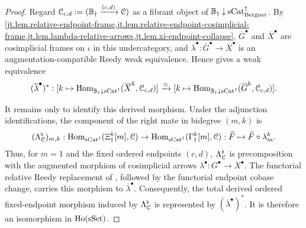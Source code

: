 \documentclass[a4paper,dvipdfmx,11pt]{amsart}
\begin{document}
\begin{proof}
  Regard $\mathcal{C}_{c,d}:=(\mathbb{B}_{\dag}\xrightarrow{(c,d)}\mathcal{C})$ as a fibrant object of $\mathbb{B}_{\dag}\mathbin{\downarrow}\mathrm{sCat}^{\dag}_{\mathrm{Bergner}}$.
  By \cref{jt.lem.relative-endpoint-frame,jt.lem.relative-endpoint-cosimplicial-frame,jt.lem.lambda-relative-arrows,jt.lem.xi-endpoint-collapse},
  $\overline G^{\bullet}$ and $\overline X^{\bullet}$ are cosimplicial frames on $\iota$ in this undercategory, and $\overline\lambda^{\bullet}:\overline G^{\bullet}\to\overline X^{\bullet}$ is an augmentation-compatible Reedy weak equivalence.
  Hence \cite[Corollary~16.5.5 (1)]{Hir02} gives a weak equivalence
  \begin{align}
    (\overline\lambda^{\bullet})^{*}:
    [k\mapsto
      \operatorname{Hom}_{\mathbb{B}_{\dag}\mathbin{\downarrow}\mathrm{sCat}^{\dag}}
      (\overline X^k,\mathcal{C}_{c,d})]
    \xrightarrow{\simeq}
    [k\mapsto
      \operatorname{Hom}_{\mathbb{B}_{\dag}\mathbin{\downarrow}\mathrm{sCat}^{\dag}}
      (\overline G^k,\mathcal{C}_{c,d})].
  \end{align}

  It remains only to identify this derived morphism.
  Under the adjunction identifications, the component of the right mate in bidegree $(m,k)$ is
  \begin{align}
    (\Lambda^{\flat}_{\mathcal{C}})_{m,k}:
    \operatorname{Hom}_{\mathrm{sCat}^{\dag}}(\Xi^k_{\dag}[m],\mathcal{C})
    \to
    \operatorname{Hom}_{\mathrm{sCat}^{\dag}}(\Gamma^k_{\dag}[m],\mathcal{C}) : 
    \widehat F
    \mapsto
    \widehat F\circ\lambda_m^k.
  \end{align}
  Thus, for $m=1$ and the fixed ordered endpoints $(c,d)$, $\Lambda^{\flat}_{\mathcal{C}}$ is precomposition with the augmented morphism of cosimplicial arrows $\lambda^{\bullet}:G^{\bullet}\to X^{\bullet}$.
  The functorial relative Reedy replacement of \cite[Proposition~16.6.8 (1)]{Hir02}, followed by the functorial endpoint cobase change, carries this morphism to $\overline\lambda^{\bullet}$.
  Consequently, the total derived ordered fixed-endpoint morphism induced by $\Lambda^{\flat}_{\mathcal{C}}$ is represented by $(\overline\lambda^{\bullet})^{*}$.
  It is therefore an isomorphism in $\mathrm{Ho}(\mathrm{sSet})$.
\end{proof}
\end{document}
